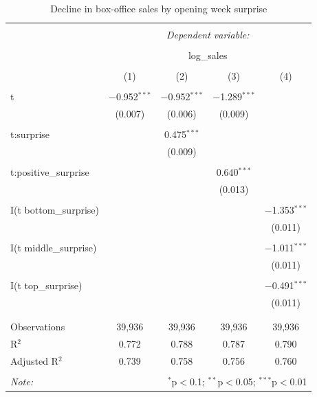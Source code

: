 \begin{table}[!htbp] \centering 
	\caption{Decline in box-office sales by opening week surprise} 
	\label{} 
	\begin{tabular}{@{\extracolsep{5pt}}lcccc} 
		\\[-1.8ex]\hline 
		\hline \\[-1.8ex] 
		& \multicolumn{4}{c}{\textit{Dependent variable:}} \\ 
		\cline{2-5} 
		\\[-1.8ex] & \multicolumn{4}{c}{log\_sales} \\ 
		\\[-1.8ex] & (1) & (2) & (3) & (4)\\ 
		\hline \\[-1.8ex] 
		t & $-$0.952$^{***}$ & $-$0.952$^{***}$ & $-$1.289$^{***}$ &  \\ 
		& (0.007) & (0.006) & (0.009) &  \\ 
		& & & & \\ 
		t:surprise &  & 0.475$^{***}$ &  &  \\ 
		&  & (0.009) &  &  \\ 
		& & & & \\ 
		t:positive\_surprise &  &  & 0.640$^{***}$ &  \\ 
		&  &  & (0.013) &  \\ 
		& & & & \\ 
		I(t \textasteriskcentered  bottom\_surprise) &  &  &  & $-$1.353$^{***}$ \\ 
		&  &  &  & (0.011) \\ 
		& & & & \\ 
		I(t \textasteriskcentered  middle\_surprise) &  &  &  & $-$1.011$^{***}$ \\ 
		&  &  &  & (0.011) \\ 
		& & & & \\ 
		I(t \textasteriskcentered  top\_surprise) &  &  &  & $-$0.491$^{***}$ \\ 
		&  &  &  & (0.011) \\ 
		& & & & \\ 
		\hline \\[-1.8ex] 
		Observations & 39,936 & 39,936 & 39,936 & 39,936 \\ 
		R$^{2}$ & 0.772 & 0.788 & 0.787 & 0.790 \\ 
		Adjusted R$^{2}$ & 0.739 & 0.758 & 0.756 & 0.760 \\ 
		\hline 
		\hline \\[-1.8ex] 
		\textit{Note:}  & \multicolumn{4}{r}{$^{*}$p$<$0.1; $^{**}$p$<$0.05; $^{***}$p$<$0.01} \\ 
	\end{tabular} 
\end{table} 

